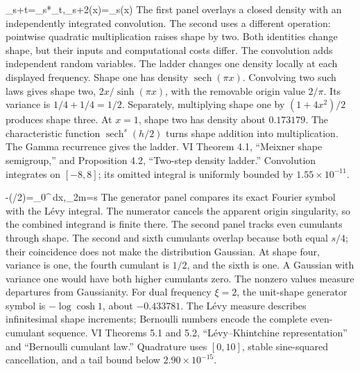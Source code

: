 {\rho_{s+t}=\rho_s*\rho_t,\qquad \rho_{s+2}(x)=\rho_s(x)}
{The first panel overlays a closed density with an independently integrated convolution. The second uses a different operation: pointwise quadratic multiplication raises shape by two. Both identities change shape, but their inputs and computational costs differ. The convolution adds independent random variables. The ladder changes one density locally at each displayed frequency.}
{Shape one has density $\operatorname{sech}(\pi x)$. Convolving two such laws gives shape two, $2x/\sinh(\pi x)$, with the removable origin value $2/\pi$. Its variance is $1/4+1/4=1/2$. Separately, multiplying shape one by $(1+4x^2)/2$ produces shape three. At $x=1$, shape two has density about $0.173179$.}
{The characteristic function $\operatorname{sech}^s(h/2)$ turns shape addition into multiplication. The Gamma recurrence gives the ladder.}
{VI Theorem 4.1, ``Meixner shape semigroup,'' and Proposition 4.2, ``Two-step density ladder.'' Convolution integrates on $[-8,8]$; its omitted integral is uniformly bounded by $1.55\times10^{-11}$.}

{-\log\cosh(\xi/2)=\int_0^\infty{}\,dx,\qquad \kappa_{2m}=s}
{The generator panel compares its exact Fourier symbol with the L\'evy integral. The numerator cancels the apparent origin singularity, so the combined integrand is finite there. The second panel tracks even cumulants through shape. The second and sixth cumulants overlap because both equal $s/4$; their coincidence does not make the distribution Gaussian.}
{At shape four, variance is one, the fourth cumulant is $1/2$, and the sixth is one. A Gaussian with variance one would have both higher cumulants zero. The nonzero values measure departures from Gaussianity. For dual frequency $\xi=2$, the unit-shape generator symbol is $-\log\cosh1$, about $-0.433781$.}
{The L\'evy measure describes infinitesimal shape increments; Bernoulli numbers encode the complete even-cumulant sequence.}
{VI Theorems 5.1 and 5.2, ``L\'evy--Khintchine representation'' and ``Bernoulli cumulant law.'' Quadrature uses $[0,10]$, stable sine-squared cancellation, and a tail bound below $2.90\times10^{-15}$.}

